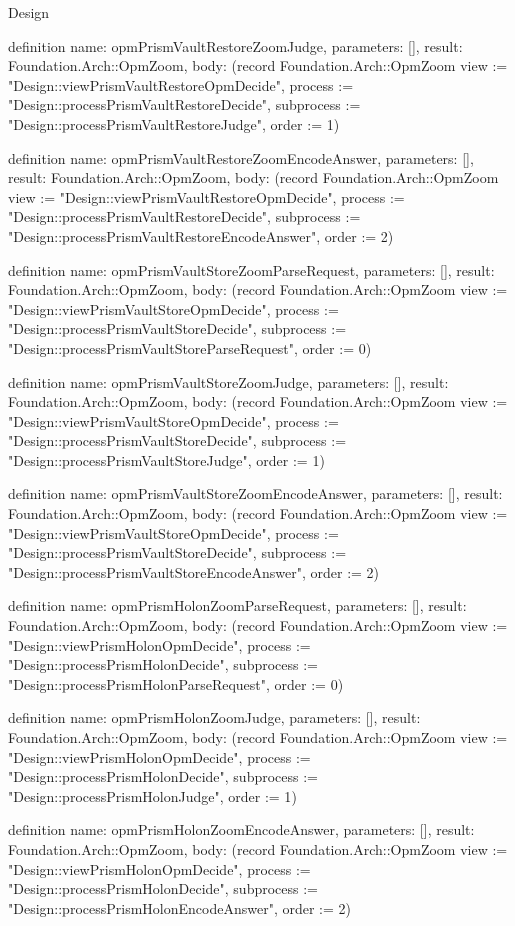 \begin{lexlean}{Design}
\begin{semanticmodule}
definition{
  name: opmPrismVaultRestoreZoomJudge,
  parameters: [],
  result: Foundation.Arch::OpmZoom,
  body: (record Foundation.Arch::OpmZoom {view := "Design::viewPrismVaultRestoreOpmDecide", process := "Design::processPrismVaultRestoreDecide", subprocess := "Design::processPrismVaultRestoreJudge", order := 1})
}

definition{
  name: opmPrismVaultRestoreZoomEncodeAnswer,
  parameters: [],
  result: Foundation.Arch::OpmZoom,
  body: (record Foundation.Arch::OpmZoom {view := "Design::viewPrismVaultRestoreOpmDecide", process := "Design::processPrismVaultRestoreDecide", subprocess := "Design::processPrismVaultRestoreEncodeAnswer", order := 2})
}

definition{
  name: opmPrismVaultStoreZoomParseRequest,
  parameters: [],
  result: Foundation.Arch::OpmZoom,
  body: (record Foundation.Arch::OpmZoom {view := "Design::viewPrismVaultStoreOpmDecide", process := "Design::processPrismVaultStoreDecide", subprocess := "Design::processPrismVaultStoreParseRequest", order := 0})
}

definition{
  name: opmPrismVaultStoreZoomJudge,
  parameters: [],
  result: Foundation.Arch::OpmZoom,
  body: (record Foundation.Arch::OpmZoom {view := "Design::viewPrismVaultStoreOpmDecide", process := "Design::processPrismVaultStoreDecide", subprocess := "Design::processPrismVaultStoreJudge", order := 1})
}

definition{
  name: opmPrismVaultStoreZoomEncodeAnswer,
  parameters: [],
  result: Foundation.Arch::OpmZoom,
  body: (record Foundation.Arch::OpmZoom {view := "Design::viewPrismVaultStoreOpmDecide", process := "Design::processPrismVaultStoreDecide", subprocess := "Design::processPrismVaultStoreEncodeAnswer", order := 2})
}

definition{
  name: opmPrismHolonZoomParseRequest,
  parameters: [],
  result: Foundation.Arch::OpmZoom,
  body: (record Foundation.Arch::OpmZoom {view := "Design::viewPrismHolonOpmDecide", process := "Design::processPrismHolonDecide", subprocess := "Design::processPrismHolonParseRequest", order := 0})
}

definition{
  name: opmPrismHolonZoomJudge,
  parameters: [],
  result: Foundation.Arch::OpmZoom,
  body: (record Foundation.Arch::OpmZoom {view := "Design::viewPrismHolonOpmDecide", process := "Design::processPrismHolonDecide", subprocess := "Design::processPrismHolonJudge", order := 1})
}

definition{
  name: opmPrismHolonZoomEncodeAnswer,
  parameters: [],
  result: Foundation.Arch::OpmZoom,
  body: (record Foundation.Arch::OpmZoom {view := "Design::viewPrismHolonOpmDecide", process := "Design::processPrismHolonDecide", subprocess := "Design::processPrismHolonEncodeAnswer", order := 2})
}


\end{semanticmodule}
\end{lexlean}
